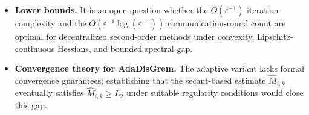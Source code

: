 \documentclass[10pt,twocolumn,letterpaper]{article}
\def\cO{O}%
\theoremstyle{compact}
\theoremstyle{compactremark}
\newcommand{\cO}{\mathcal{O}}
\begin{document}
\begin{itemize}[leftmargin=1.2em,itemsep=2pt]
		\item \textbf{Lower bounds.}
		It is an open question whether the $\cO(\varepsilon^{-1})$ iteration
		complexity and the $\cO(\varepsilon^{-1}\log(\varepsilon^{-1}))$
		communication-round count are optimal for decentralized
		second-order methods under convexity, Lipschitz-continuous Hessians,
		and bounded spectral gap.
		\item \textbf{Convergence theory for AdaDisGrem.}
		The adaptive variant lacks formal convergence guarantees;
		establishing that the secant-based estimate $\hat M_{i,k}$ eventually
		satisfies $\hat M_{i,k}\ge L_2$ under suitable regularity conditions
		would close this gap.
	\end{itemize}
	
\end{document}
